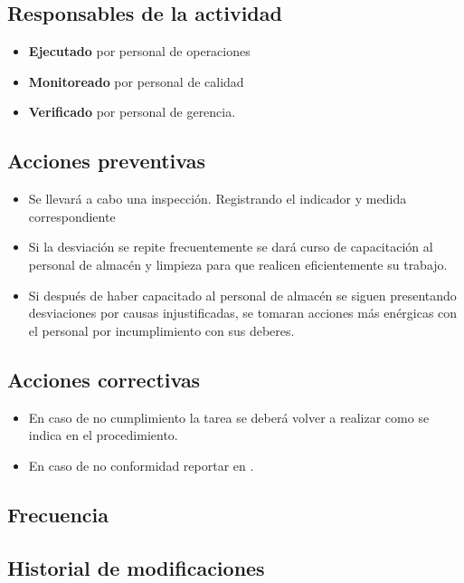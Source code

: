 \subsection{Responsables de la actividad}

\begin{itemize}
	\item \textbf{Ejecutado} por personal de operaciones
	\item \textbf{Monitoreado} por personal de calidad
	\item \textbf{Verificado} por personal de gerencia.
\end{itemize}

\subsection{Acciones preventivas}

\begin{itemize}
	\item Se llevará a cabo una inspección. Registrando el indicador y medida correspondiente
	\item Si la desviación se repite frecuentemente se dará curso de capacitación al personal de almacén y limpieza para que realicen eficientemente su trabajo.
	\item Si después de haber capacitado al personal de almacén se siguen presentando desviaciones por causas injustificadas, se tomaran acciones más enérgicas con el personal por incumplimiento con sus deberes.
\end{itemize}

\subsection{Acciones correctivas}

\begin{itemize}
	\item En caso de no cumplimiento la tarea se deberá volver a realizar como se indica en el procedimiento.
	\item En caso de no conformidad reportar en \RAC.
\end{itemize}

\subsection{Frecuencia}

\subsection{Historial de modificaciones}


